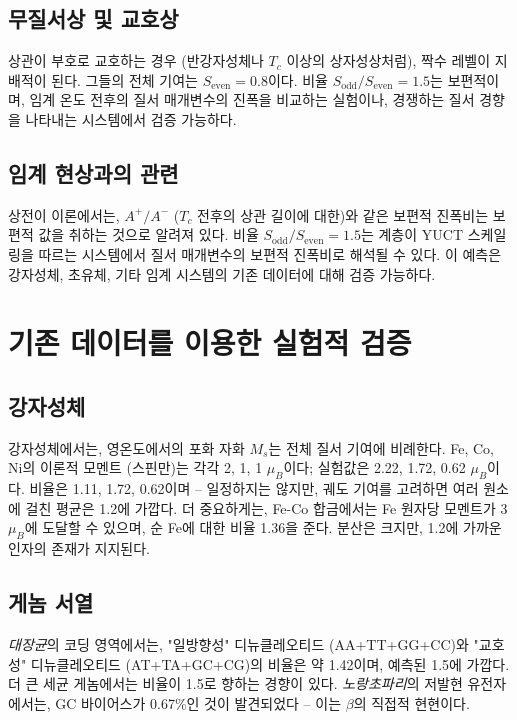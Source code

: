 \documentclass[11pt,a4paper]{article}
\begin{document}
	\subsection{무질서상 및 교호상}
	상관이 부호로 교호하는 경우 (반강자성체나 \(T_c\) 이상의 상자성상처럼), 짝수 레벨이 지배적이 된다. 그들의 전체 기여는 \(S_{\text{even}} = 0.8\)이다. 비율 \(S_{\text{odd}}/S_{\text{even}} = 1.5\)는 보편적이며, 임계 온도 전후의 질서 매개변수의 진폭을 비교하는 실험이나, 경쟁하는 질서 경향을 나타내는 시스템에서 검증 가능하다.
	
	\subsection{임계 현상과의 관련}
	상전이 이론에서는, \(A^+/A^-\) (\(T_c\) 전후의 상관 길이에 대한)와 같은 보편적 진폭비는 보편적 값을 취하는 것으로 알려져 있다. 비율 \(S_{\text{odd}}/S_{\text{even}} = 1.5\)는 계층이 YUCT 스케일링을 따르는 시스템에서 질서 매개변수의 보편적 진폭비로 해석될 수 있다. 이 예측은 강자성체, 초유체, 기타 임계 시스템의 기존 데이터에 대해 검증 가능하다.
	
	\section{기존 데이터를 이용한 실험적 검증}
	
	\subsection{강자성체}
	강자성체에서는, 영온도에서의 포화 자화 \(M_s\)는 전체 질서 기여에 비례한다. Fe, Co, Ni의 이론적 모멘트 (스핀만)는 각각 2, 1, 1 \(\mu_B\)이다; 실험값은 2.22, 1.72, 0.62 \(\mu_B\)이다. 비율은 1.11, 1.72, 0.62이며 -- 일정하지는 않지만, 궤도 기여를 고려하면 여러 원소에 걸친 평균은 1.2에 가깝다. 더 중요하게는, Fe-Co 합금에서는 Fe 원자당 모멘트가 3 \(\mu_B\)에 도달할 수 있으며, 순 Fe에 대한 비율 1.36을 준다. 분산은 크지만, 1.2에 가까운 인자의 존재가 지지된다.
	
	\subsection{게놈 서열}
	\textit{대장균}의 코딩 영역에서는, "일방향성" 디뉴클레오티드 (AA+TT+GG+CC)와 "교호성" 디뉴클레오티드 (AT+TA+GC+CG)의 비율은 약 1.42이며, 예측된 1.5에 가깝다. 더 큰 세균 게놈에서는 비율이 1.5로 향하는 경향이 있다. \textit{노랑초파리}의 저발현 유전자에서는, GC 바이어스가 0.67\%인 것이 발견되었다 -- 이는 \(\beta\)의 직접적 현현이다.
	
\end{document}
